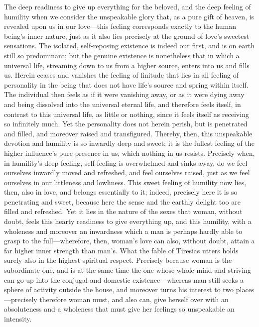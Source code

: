 \documentclass[12pt,a4paper]{book}
\begin{document}
The deep readiness to give up everything for the beloved, and the deep
feeling of humility when we consider the unspeakable glory that, as a pure
gift of heaven, is revealed upon us in our love---this feeling corresponds
exactly to the human being's inner nature, just as it also lies precisely
at the ground of love's sweetest sensations. The isolated, self-reposing
existence is indeed our first, and is on earth still so predominant; but
the genuine existence is nonetheless that in which a universal life,
streaming down to us from a higher source, enters into us and fills us.
Herein ceases and vanishes the feeling of finitude that lies in all
feeling of personality in the being that does not have life's source and
spring within itself. The individual then feels as if it were vanishing
away, or as it were dying away and being dissolved into the universal
eternal life, and therefore feels itself, in contrast to this universal
life, as little or nothing, since it feels itself as receiving so
infinitely much. Yet the personality does not herein perish, but is
penetrated and filled, and moreover raised and transfigured. Thereby,
then, this unspeakable devotion and humility is so inwardly deep and
sweet; it is the fullest feeling of the higher influence's pure presence in
us, which nothing in us resists. Precisely when, in humility's deep
feeling, self-feeling is overwhelmed and sinks away, do we feel ourselves
inwardly moved and refreshed, and feel ourselves raised, just as we feel
ourselves in our littleness and lowliness. This sweet feeling of humility
now lies, then, also in love, and belongs essentially to it; indeed,
precisely here it is so penetrating and sweet, because here the sense and
the earthly delight too are filled and refreshed. Yet it lies in the nature
of the sexes that woman, without doubt, feels this hearty readiness to
give everything up, and this humility, with a wholeness and moreover an
inwardness which a man is perhaps hardly able to grasp to the
full---wherefore, then, woman's love can also, without doubt, attain a far
higher inner strength than man's. What the fable of Tiresias utters holds
surely also in the highest spiritual respect. Precisely because woman is
the subordinate one, and is at the same time the one whose whole mind and
striving can go up into the conjugal and domestic existence---whereas man
still seeks a sphere of activity outside the house, and moreover turns his
interest to two places---precisely therefore woman must, and also can, give
herself over with an absoluteness and a wholeness that must give her
feelings so unspeakable an intensity.
\end{document}
